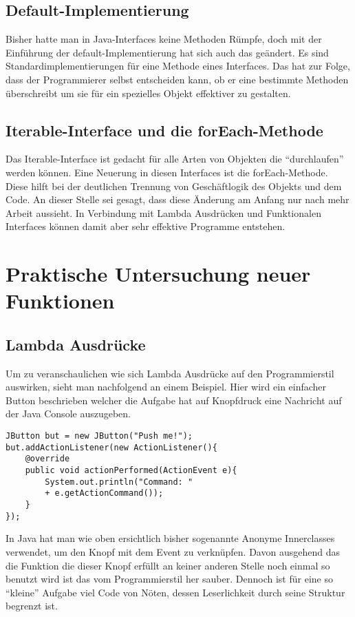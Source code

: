 \section{Default-Implementierung}
\label{sec:DI}
Bisher hatte man in Java-Interfaces keine Methoden Rümpfe, doch mit der
Einführung der default-Implementierung hat sich auch das geändert. Es sind
Standardimplementierungen für eine Methode eines Interfaces. Das hat zur Folge,
dass der Programmierer selbst entscheiden kann, ob er eine bestimmte Methoden
überschreibt um sie für ein spezielles Objekt effektiver zu gestalten.

\section{Iterable-Interface und die forEach-Methode}
\label{sec:IIufEM}
Das Iterable-Interface ist gedacht für alle Arten von Objekten die
"`durchlaufen"' werden können. Eine Neuerung in diesen Interfaces ist die
forEach-Methode. Diese hilft bei der deutlichen Trennung von Geschäftlogik des
Objekts und dem Code. An dieser Stelle sei gesagt, dass diese Änderung am Anfang
nur nach mehr Arbeit aussieht. In Verbindung mit Lambda Ausdrücken und
Funktionalen Interfaces können damit aber sehr effektive Programme entstehen. 


\chapter{Praktische Untersuchung neuer Funktionen}
\label{sec:Praxis}

\section{Lambda Ausdrücke}
\label{sec:Lambda}
Um zu veranschaulichen wie sich Lambda Ausdrücke auf den Programmierstil
auswirken, sieht man nachfolgend an einem Beispiel. Hier wird ein einfacher
Button beschrieben welcher die Aufgabe hat auf Knopfdruck eine Nachricht auf der
Java Console auszugeben.

\lstset{language=Java}  
\begin{lstlisting}
JButton but = new JButton("Push me!");
but.addActionListener(new ActionListener(){
	@override
	public void actionPerformed(ActionEvent e){
		System.out.println("Command: " 
		+ e.getActionCommand());
	}
});
\end{lstlisting}

In Java hat man wie oben ersichtlich bisher sogenannte Anonyme Innerclasses
verwendet, um den Knopf mit dem Event zu verknüpfen. Davon ausgehend das die
Funktion die dieser Knopf erfüllt an keiner anderen Stelle noch einmal so benutzt wird ist das vom Programmierstil her
sauber. Dennoch ist für eine so "`kleine"' Aufgabe viel Code von Nöten, dessen
Leserlichkeit durch seine Struktur begrenzt ist.

